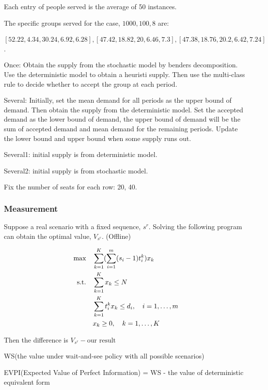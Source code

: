 Each entry of people served is the average of 50 instances.


The specific groups served for the case, $1000, 100, 8$ are:

$[52.22, 4.34, 30.24, 6.92, 6.28], [47.42, 18.82, 20, 6.46, 7.3], [47.38, 18.76, 20.2, 6.42, 7.24]$ .

Once: Obtain the supply from the stochastic model by benders decomposition. Use the deterministic model to obtain a heuristi supply. Then use the multi-class rule to decide whether to accept the group at each period.

Several: Initially, set the mean demand for all periods as the upper bound of demand. Then obtain the supply from the deterministic model. Set the accepted demand as the lower bound of demand, the upper bound of demand will be the sum of accepted demand and mean demand for the remaining periods. Update the lower bound and upper bound when some supply runs out.

Several1: initial supply is from deterministic model.

Several2: initial supply is from stochastic model.

Fix the number of seats for each row: 20, 40.

\subsubsection{Measurement}

Suppose a real scenario with a fixed sequence, $s^{r}$. Solving the following program can obtain the optimal value, $V_{s^{r}}$. (Offline)

\begin{equation*}
\begin{aligned}
  \mbox{max}\quad & \sum_{k=1}^K(\sum_{i=1}^m (s_i-1)t_i^k) x_{k} \\
  \mbox{s.t.} \quad & \sum_{k=1}^K x_{k} \leq N \\
  & \sum_{k=1}^K t_i^k x_k \leq d_i,\quad i=1,\ldots,m \\
  & x_{k} \geq 0, \quad k = 1,\ldots,K \notag
\end{aligned}
\end{equation*}

Then the difference is $V_{s^{r}} - \text{our result}$

WS(the value under wait-and-see policy with all possible scenarios)

EVPI(Expected Value of Perfect Information) = WS - the value of deterministic equivalent form


